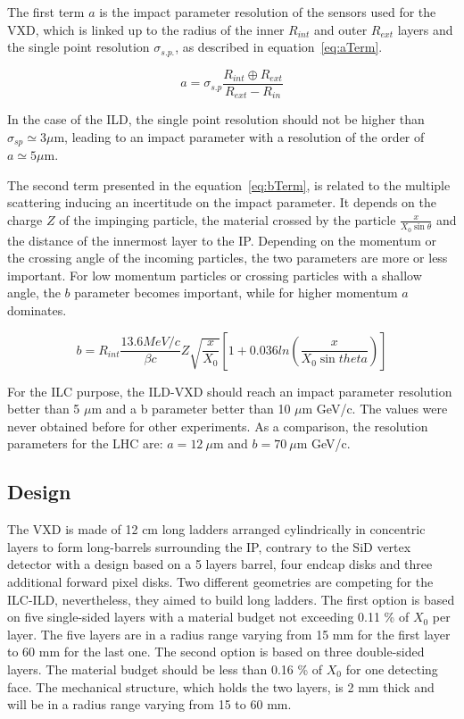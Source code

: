    The first term $a$ is the impact parameter resolution of the sensors used for the \gls{VXD}, which is linked up to the radius of the inner $R_{int}$ and outer $R_{ext}$ layers and the single point resolution $\sigma_{s.p.}$, as described in equation~\ref{eq:aTerm}.

   \begin{equation}
     a = \sigma_{s.p}\frac{R_{int} \oplus R_{ext}}{R_{ext} - R_{in}}
     \label{eq:aTerm}
   \end{equation}

    In the case of the \gls{ILD}, the single point resolution should not be higher than $\sigma_{sp} \simeq 3 \mu\text{m}$, leading to an impact parameter with a resolution of the order of $a \simeq 5 \mu\text{m}$.
   
    The second term presented in the equation~\ref{eq:bTerm}, is related to the multiple scattering inducing an incertitude on the impact parameter.
    It depends on the charge $Z$ of the impinging particle, the material crossed by the particle $\frac{x}{X_0 \sin{\theta}}$ and the distance of the innermost layer to the \gls{IP}.
    Depending on the momentum or the crossing angle of the incoming particles, the two parameters are more or less important.
    For low momentum particles or crossing particles with a shallow angle, the $b$ parameter becomes important, while for higher momentum $a$ dominates.


    \begin{equation}
      b = R_{int} \frac{13.6 MeV/c}{\beta c}  Z \sqrt{\frac{x}{X_{0}}} \left[ 1 + 0.036 ln \left( \frac{x}{X_{0}\sin{theta}} \right) \right]
      \label{eq:bTerm}
    \end{equation}
   
   For the \gls{ILC} purpose, the \gls{ILD}-\gls{VXD} should reach an impact parameter resolution better than 5 $\mu$m and a b parameter better than 10 $\mu$m GeV/c. 
   The values were never obtained before for other experiments. 
   As a comparison, the resolution parameters for the \gls{LHC} are: $a =  12 \ \mu$m and $b = 70 \ \mu$m GeV/c. 

   \subsection{Design}

   The \gls{VXD} is made of 12 cm long ladders arranged cylindrically in concentric layers to form long-barrels surrounding the \gls{IP}, contrary to the \gls{SiD} vertex detector with a design based on a 5 layers barrel, four endcap disks and three additional forward pixel disks.
   Two different geometries are competing for the \gls{ILC}-{ILD}, nevertheless, they aimed to build long ladders. 
   The first option is based on five single-sided layers with a material budget not exceeding 0.11 \% of $X_0$ per layer.
   The five layers are in a radius range varying from 15 mm for the first layer to 60 mm for the last one.
   The second option is based on three double-sided layers.
   The material budget should be less than 0.16 \% of $X_0$ for one detecting face.
   The mechanical structure, which holds the two layers, is 2 mm thick and will be in a radius range varying from 15 to 60 mm.

